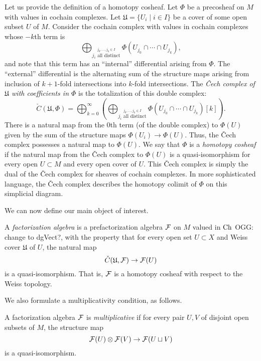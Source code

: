 \documentclass[11pt]{amsart}
\def\owen#1{{\textcolor{green!65!black}{OGG: {#1}}}}
\begin{document}
Let us provide the definition of a homotopy cosheaf. 
Let $\Phi$ be a precosheaf on $M$ with values in cochain complexes. Let $\mathfrak{U} = \{U_i \mid i \in I\}$ be a cover of some open subset $U$ of $M$.  Consider the cochain complex with values in cochain complexes whose $-k$th term is 
\[
\bigoplus_{\stackrel{j_0,\ldots, j_k \in I}{j_i \text{ all distinct}}} \Phi (U_{j_0} \cap \cdots \cap U_{j_k}),
\]
and note that this term has an ``internal'' differential arising from $\Phi$. The ``external'' differential is the alternating sum of the structure maps arising from inclusion of $k+1$-fold intersections into $k$-fold intersections. The \emph{\v{C}ech complex of $\mathfrak{U}$ with coefficients in $\Phi$} is the totalization of this double complex:
$$
\check{C}(\mathfrak{U}, \Phi) = \bigoplus_{k=0}^\infty \left( \bigoplus_{\stackrel{j_0,\ldots, j_k \in I}{j_i \text{ all distinct}}} \Phi (U_{j_0} \cap \cdots \cap U_{j_k}) [ k]   \right).
$$
There is a natural map from the $0$th term (of the double complex) to $\Phi(U)$ given by the sum of the structure maps $\Phi(U_i) \to \Phi(U)$. Thus, the \v{C}ech complex possesses a natural map to $\Phi(U)$. We say that $\Phi$ is a \emph{homotopy cosheaf} if the natural map from the \v{C}ech complex to $\Phi(U)$ is a quasi-isomorphism for every open $U \subset M$ and every open cover of $U$. This \v{C}ech complex is simply the dual of the \v{C}ech complex for sheaves of cochain complexes.
In more sophisticated language, the \v{C}ech complex describes the homotopy colimit of $\Phi$ on this simplicial diagram.

We can now define our main object of interest. 

\begin{dfn}
A \emph{factorization algebra} is a prefactorization algebra $\mathcal F$ on $M$ valued in ${\rm Ch}$ \owen{change to dgVect?}, with the property that for every open set $U \subset X$ and Weiss cover $\mathfrak{U}$ of $U$, the natural map
$$
\check{C}(\mathfrak{U},\mathcal F) \to \mathcal F(U)
$$
is a quasi-isomorphism. That is, $\mathcal F$ is a homotopy cosheaf with respect to the Weiss topology.
\end{dfn}

We also formulate a multiplicativity condition, as follows. 

\begin{dfn}
A factorization algebra $\mathcal F$ is \emph{multiplicative} if for every pair $U,V$ of disjoint open subsets of $M$, the structure map
$$
\mathcal F(U) \otimes \mathcal F(V) \to \mathcal F(U \sqcup V) 
$$
is a quasi-isomorphism.
\end{dfn}
\end{document}
